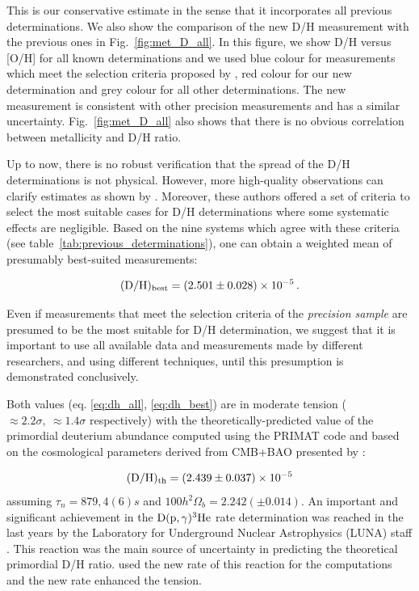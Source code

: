 \documentclass[fleqn,usenatbib]{mnras}
\begin{document}
This is our conservative estimate in the sense that it incorporates all previous determinations.
We also show the comparison of the new D/H measurement with the previous ones in Fig.~\ref{fig:met_D_all}. In this figure, we show D/H versus [O/H] for all known determinations and we used blue colour for measurements which meet the selection criteria proposed by \citet{Cooke_2014}, red colour for our new determination and grey colour for all other determinations. The new measurement is consistent with other precision measurements and has a similar uncertainty. Fig.~\ref{fig:met_D_all} also shows that there is no obvious correlation between metallicity and D/H ratio. 


 
Up to now, there is no robust verification that the spread of the D/H determinations is not physical. However, more high-quality observations can clarify estimates as shown by \cite{Cooke_2014}. Moreover, these authors offered a set of criteria to select the most suitable cases for D/H determinations where some systematic effects are negligible. Based on the nine systems which agree with these criteria (see table~\ref{tab:previous_determinations}), one can obtain a weighted mean of presumably best-suited measurements:

\begin{equation}
    \rm{(D/H)_{best}} =  \left(2.501 \pm 0.028 \right) \times 10^{-5}\,.
    \label{eq:dh_best}
\end{equation}     

Even if measurements that meet the selection criteria of the \textit{precision sample} are presumed to be the most suitable for D/H determination, we suggest that it is important to use all available data and measurements made by different researchers, and using different techniques, until this presumption is demonstrated conclusively.

Both values (eq. \ref{eq:dh_all}, \ref{eq:dh_best}) are
in moderate tension ($\approx\!\!2.2\sigma, \ \approx\!\!1.4\sigma$ respectively) with the theoretically-predicted value of the primordial deuterium abundance computed using the PRIMAT code and based on the cosmological parameters derived from CMB+BAO \citep{PL18} presented by \cite{Pitrou2021}:

\begin{equation}
    (\rm{D/H})_{\rm th} =  \left(2.439 \pm 0.037 \right) \times 10^{-5}
\end{equation}    
assuming $\tau_n = 879,4(6) s $ and  $100h^2
\Omega_b = 2.242 (\pm0.014) $. An important and significant achievement in the $\rm D(p,\gamma)^3He$ rate determination was reached in the last years by the Laboratory for Underground Nuclear Astrophysics (LUNA) staff \citep{Mossa_2020}. This reaction was the main source of uncertainty in predicting the theoretical primordial D/H ratio.
\cite{Pitrou2021} used the new rate of this reaction for the computations and the new rate enhanced the tension. 
\end{document}
